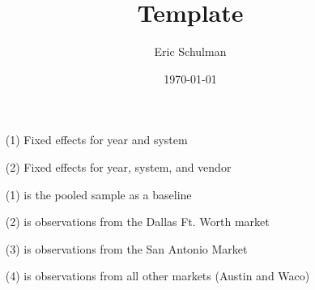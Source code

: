 \documentclass{article}
\title{Template}
\author{Eric Schulman}
\date{\today}
\begin{document}

\clearpage



\begin{enumerate}
\item[(1)] Fixed effects for year and system
\item[(2)] Fixed effects for year, system, and vendor

\end{enumerate}


\clearpage




\begin{enumerate}
\item[(1)] is the pooled sample as a baseline
\item[(2)] is observations from the Dallas Ft. Worth market
\item[(3)] is observations from the San Antonio Market
\item[(4)] is observations from all other markets (Austin and Waco)
\end{enumerate}

\clearpage
\end{document}
